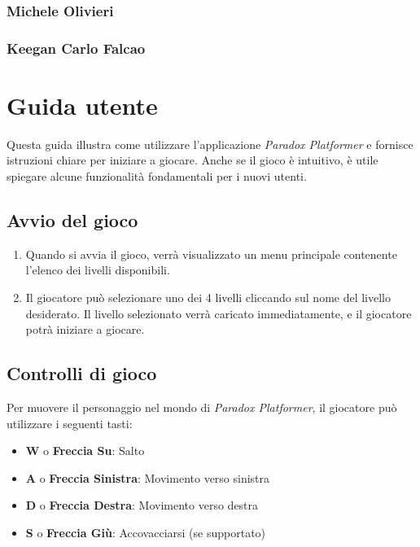 \documentclass[a4paper,12pt]{report}
\begin{document}
\subsection{Michele Olivieri}
\subsection{Keegan Carlo Falcao}
	
	\appendix
	\chapter{Guida utente}
	
	Questa guida illustra come utilizzare l’applicazione \textit{Paradox Platformer} e fornisce istruzioni chiare per iniziare a giocare. Anche se il gioco è intuitivo, è utile spiegare alcune funzionalità fondamentali per i nuovi utenti.
	
	\section{Avvio del gioco}
	
	\begin{enumerate}
		\item Quando si avvia il gioco, verrà visualizzato un menu principale contenente l’elenco dei livelli disponibili.
		\item Il giocatore può selezionare uno dei 4 livelli cliccando sul nome del livello desiderato. Il livello selezionato verrà caricato immediatamente, e il giocatore potrà iniziare a giocare.
	\end{enumerate}
	
	\section{Controlli di gioco}
	
	Per muovere il personaggio nel mondo di \textit{Paradox Platformer}, il giocatore può utilizzare i seguenti tasti:
	
	\begin{itemize}
		\item \textbf{W} o \textbf{Freccia Su}: Salto
		\item \textbf{A} o \textbf{Freccia Sinistra}: Movimento verso sinistra
		\item \textbf{D} o \textbf{Freccia Destra}: Movimento verso destra
		\item \textbf{S} o \textbf{Freccia Giù}: Accovacciarsi (se supportato)
	\end{itemize}
	
	
	
	
\end{document}
